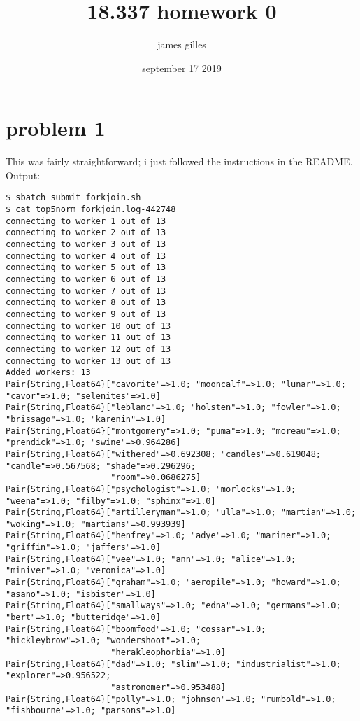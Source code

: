 \documentclass[nobib]{tufte-handout}
\author{james gilles}
\date{september 17 2019}
\title{18.337 homework 0}
\makeatletter
\renewcommand{\maketitle}{%
\begingroup
\setlength{\parindent}{0pt}%
\setlength{\parskip}{4pt}%
\LARGE\scshape\plaintitle\par
\Large\itshape\plainauthor\par
\Large\itshape\thedate\par
\endgroup
}
\makeatother
\begin{document}
\maketitle
\tableofcontents


\section{problem 1}
\label{sec:orgb10beff}

This was fairly straightforward; i just followed the instructions in the README.
Output:
\begin{verbatim}
$ sbatch submit_forkjoin.sh
$ cat top5norm_forkjoin.log-442748
connecting to worker 1 out of 13
connecting to worker 2 out of 13
connecting to worker 3 out of 13
connecting to worker 4 out of 13
connecting to worker 5 out of 13
connecting to worker 6 out of 13
connecting to worker 7 out of 13
connecting to worker 8 out of 13
connecting to worker 9 out of 13
connecting to worker 10 out of 13
connecting to worker 11 out of 13
connecting to worker 12 out of 13
connecting to worker 13 out of 13
Added workers: 13
Pair{String,Float64}["cavorite"=>1.0; "mooncalf"=>1.0; "lunar"=>1.0; "cavor"=>1.0; "selenites"=>1.0]
Pair{String,Float64}["leblanc"=>1.0; "holsten"=>1.0; "fowler"=>1.0; "brissago"=>1.0; "karenin"=>1.0]
Pair{String,Float64}["montgomery"=>1.0; "puma"=>1.0; "moreau"=>1.0; "prendick"=>1.0; "swine"=>0.964286]
Pair{String,Float64}["withered"=>0.692308; "candles"=>0.619048; "candle"=>0.567568; "shade"=>0.296296;
                     "room"=>0.0686275]
Pair{String,Float64}["psychologist"=>1.0; "morlocks"=>1.0; "weena"=>1.0; "filby"=>1.0; "sphinx"=>1.0]
Pair{String,Float64}["artilleryman"=>1.0; "ulla"=>1.0; "martian"=>1.0; "woking"=>1.0; "martians"=>0.993939]
Pair{String,Float64}["henfrey"=>1.0; "adye"=>1.0; "mariner"=>1.0; "griffin"=>1.0; "jaffers"=>1.0]
Pair{String,Float64}["vee"=>1.0; "ann"=>1.0; "alice"=>1.0; "miniver"=>1.0; "veronica"=>1.0]
Pair{String,Float64}["graham"=>1.0; "aeropile"=>1.0; "howard"=>1.0; "asano"=>1.0; "isbister"=>1.0]
Pair{String,Float64}["smallways"=>1.0; "edna"=>1.0; "germans"=>1.0; "bert"=>1.0; "butteridge"=>1.0]
Pair{String,Float64}["boomfood"=>1.0; "cossar"=>1.0; "hickleybrow"=>1.0; "wondershoot"=>1.0;
                     "herakleophorbia"=>1.0]
Pair{String,Float64}["dad"=>1.0; "slim"=>1.0; "industrialist"=>1.0; "explorer"=>0.956522;
                     "astronomer"=>0.953488]
Pair{String,Float64}["polly"=>1.0; "johnson"=>1.0; "rumbold"=>1.0; "fishbourne"=>1.0; "parsons"=>1.0]
\end{verbatim}
\end{document}
